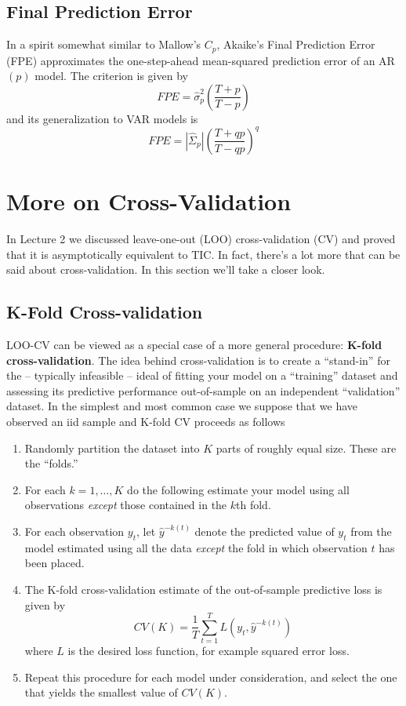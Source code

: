 \documentclass[12pt]{article}
\theoremstyle{definition}
\begin{document}
\subsection{Final Prediction Error}
In a spirit somewhat similar to Mallow's $C_p$, Akaike's Final Prediction Error (FPE) approximates the one-step-ahead mean-squared prediction error of an AR$(p)$ model. The criterion is given by
	$$FPE = \widehat{\sigma}_p^2\left(\frac{T+p}{T-p} \right)$$
and its generalization to VAR models is 
$$FPE = \left| \widehat{\Sigma}_p \right| \left( \frac{T + qp}{T - qp}\right)^q$$



\section{More on Cross-Validation}
In Lecture 2 we discussed leave-one-out (LOO) cross-validation (CV) and proved that it is asymptotically equivalent to TIC. In fact, there's a lot more that can be said about cross-validation. In this section we'll take a closer look.

\subsection{K-Fold Cross-validation}
LOO-CV can be viewed as a special case of a more general procedure: \textbf{K-fold cross-validation}. The idea behind cross-validation is to create a ``stand-in'' for the -- typically infeasible -- ideal of fitting your model on a ``training'' dataset and assessing its predictive performance out-of-sample on an independent ``validation'' dataset. In the simplest and most common case we suppose that we have observed an iid sample and K-fold CV proceeds as follows
	\begin{enumerate}
		\item Randomly partition the dataset into $K$ parts of roughly equal size. These are the ``folds.''
		\item For each $k = 1, \hdots, K$ do the following estimate your model using all observations \emph{except} those contained in the $k$th fold. 
		\item For each observation $y_t$, let $\widehat{y}^{-k(t)}$ denote the predicted value of $y_t$ from the model estimated using all the data \emph{except} the fold in which observation $t$ has been placed.
		\item The K-fold cross-validation estimate of the out-of-sample predictive loss is given by
			$$CV(K) = \frac{1}{T}\sum_{t=1}^T L\left(y_t, \widehat{y}^{-k(t)}\right)$$
		where $L$ is the desired loss function, for example squared error loss.
		\item Repeat this procedure for each model under consideration, and select the one that yields the smallest value of $CV(K)$.
	\end{enumerate}
\end{document}

